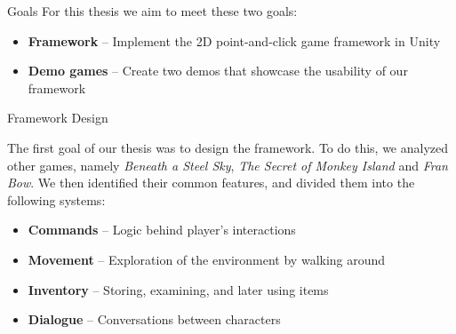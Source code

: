 \documentclass[portrait,a0paper,fontscale=0.35]{baposter}
\begin{document}
\begin{poster}
\begin{posterbox}[column=0, span=1, name=goals, below=background, headerColorOne=cyan!40, boxColorOne=cyan!10]{Goals}
For this thesis we aim to meet these two goals:
\begin{itemize}
\setlength\itemsep{0.05em}
\item \textbf{Framework} -- Implement the 2D point-and-click game framework in Unity
\item \textbf{Demo games} -- Create two demos that showcase the usability of our framework
\end{itemize}

\end{posterbox}

\begin{posterbox}[column=0, span=1, name=architecture, below=goals]{Framework Design}

The first goal of our thesis was to design the framework. To do this, we analyzed other games,
namely \textit{Beneath a Steel Sky}, \textit{The Secret of Monkey Island} and \textit{Fran Bow}. We then identified their common features, and divided them into the following systems:
\begin{itemize}
\setlength\itemsep{0.05em}
    \item \textbf{Commands} -- Logic behind player's interactions
    \item \textbf{Movement} -- Exploration of the environment by walking around
    \item \textbf{Inventory} -- Storing, examining, and later using items
    \item \textbf{Dialogue} -- Conversations between characters
\end{itemize}

\end{posterbox}


\end{poster}
\end{document}
